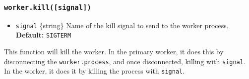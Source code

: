 \begin{Shaded}
\begin{Highlighting}[]
\NormalTok{(}\OperatorTok{,}\OperatorTok{,}\OperatorTok{,}\KeywordTok{=\textgreater{}}\NormalTok{ \{}
    \NormalTok{(}\OperatorTok{,}\NormalTok{())}\OperatorTok{;}
\NormalTok{  \})}\OperatorTok{;}
\NormalTok{\} }\NormalTok{ \{}
\OperatorTok{,}\KeywordTok{=\textgreater{}}\NormalTok{ \{}
\NormalTok{(}\NormalTok{)}\OperatorTok{;}
\NormalTok{(}\VerbatimStringTok{ }\SpecialCharTok{$\{}\SpecialCharTok{\}}\VerbatimStringTok{\textasciigrave{}}\NormalTok{)}\OperatorTok{;}
    \NormalTok{(}\NormalTok{)}\OperatorTok{;}
\NormalTok{  \})}\NormalTok{(}\NormalTok{)}\OperatorTok{;}
\NormalTok{\}}
\end{Highlighting}
\end{Shaded}

\subsubsection{\texorpdfstring{\texttt{worker.kill({[}signal{]})}}{worker.kill({[}signal{]})}}\label{worker.killsignal}

\begin{itemize}
\tightlist
\item
  \texttt{signal} \{string\} Name of the kill signal to send to the
  worker process. \textbf{Default:}
  \texttt{\textquotesingle{}SIGTERM\textquotesingle{}}
\end{itemize}

This function will kill the worker. In the primary worker, it does this
by disconnecting the \texttt{worker.process}, and once disconnected,
killing with \texttt{signal}. In the worker, it does it by killing the
process with \texttt{signal}.

